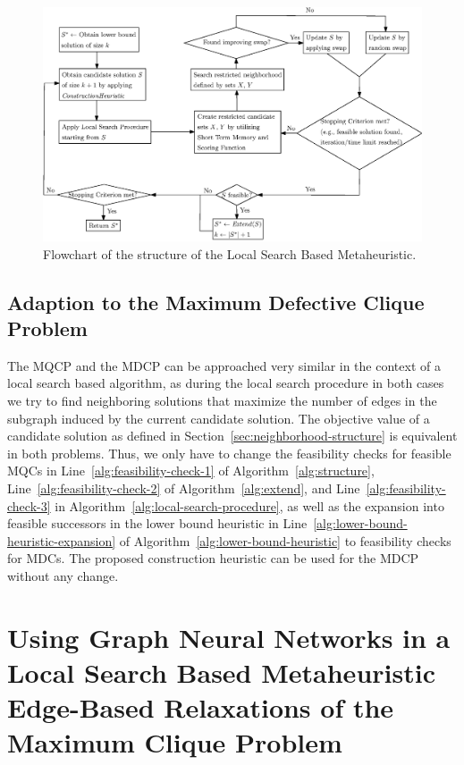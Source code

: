\documentclass[draft,final]{vutinfth} %
\begin{document}
\begin{figure}
    \centering
    \includegraphics[width=\textwidth]{graphics/flowchart_local_search_algorithm.eps}
    \caption{Flowchart of the structure of the Local Search Based Metaheuristic.}
    \label{fig:flowchart-local-search-algorithm}
\end{figure}
 
\section{Adaption to the Maximum Defective Clique Problem}\label{sec:adaption-to-mdcp}
The MQCP and the MDCP can be approached very similar in the context of a local search based algorithm, as during the local search procedure in both cases we try to find neighboring solutions that maximize the number of edges in the subgraph induced by the current candidate solution. The objective value of a candidate solution as defined in Section~\ref{sec:neighborhood-structure} is equivalent in both problems. Thus, we only have to change the feasibility checks for feasible MQCs in Line~\ref{alg:feasibility-check-1} of Algorithm~\ref{alg:structure}, Line~\ref{alg:feasibility-check-2} of Algorithm~\ref{alg:extend}, and Line~\ref{alg:feasibility-check-3} in Algorithm~\ref{alg:local-search-procedure}, as well as the expansion into feasible successors in the lower bound heuristic in Line~\ref{alg:lower-bound-heuristic-expansion} of Algorithm~\ref{alg:lower-bound-heuristic} to feasibility checks for MDCs. The proposed construction heuristic can be used for the MDCP without any change.  

\chapter{Using Graph Neural Networks in a Local Search Based Metaheuristic Edge-Based Relaxations of the Maximum Clique Problem}\label{chp:gnn}
\end{document}
